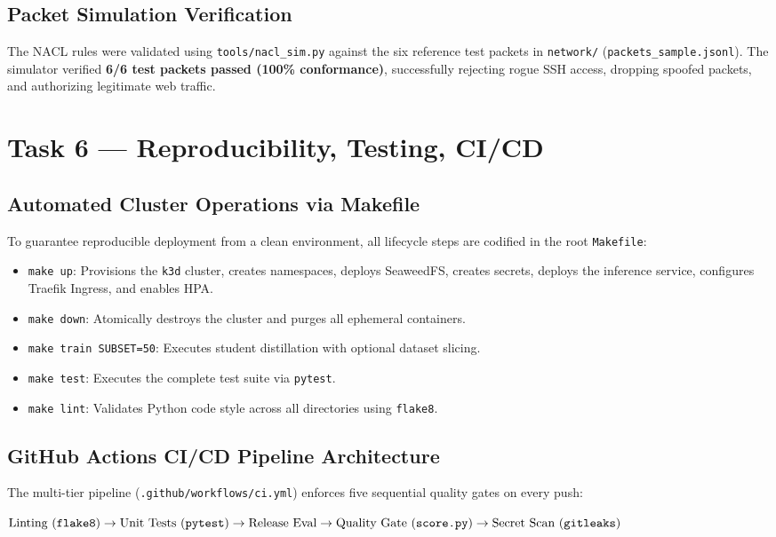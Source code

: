 \documentclass[10pt,a4paper]{article}
\begin{document}
\subsection{Packet Simulation Verification}
The NACL rules were validated using \texttt{tools/nacl\_sim.py} against the six reference test packets in \texttt{network/} (\texttt{packets\_sample.jsonl}). The simulator verified \textbf{6/6 test packets passed (100\% conformance)}, successfully rejecting rogue SSH access, dropping spoofed packets, and authorizing legitimate web traffic.

\vspace{0.25cm}

\section{Task 6 --- Reproducibility, Testing, CI/CD}

\subsection{Automated Cluster Operations via Makefile}
To guarantee reproducible deployment from a clean environment, all lifecycle steps are codified in the root \texttt{Makefile}:
\begin{itemize}[noitemsep,topsep=2pt,leftmargin=*]
    \item \texttt{make up}: Provisions the \texttt{k3d} cluster, creates namespaces, deploys SeaweedFS, creates secrets, deploys the inference service, configures Traefik Ingress, and enables HPA.
    \item \texttt{make down}: Atomically destroys the cluster and purges all ephemeral containers.
    \item \texttt{make train SUBSET=50}: Executes student distillation with optional dataset slicing.
    \item \texttt{make test}: Executes the complete test suite via \texttt{pytest}.
    \item \texttt{make lint}: Validates Python code style across all directories using \texttt{flake8}.
\end{itemize}

\subsection{GitHub Actions CI/CD Pipeline Architecture}
The multi-tier pipeline (\texttt{.github/workflows/ci.yml}) enforces five sequential quality gates on every push:
\begin{center}
\small
$\text{Linting (\texttt{flake8})} \to \text{Unit Tests (\texttt{pytest})} \to \text{Release Eval} \to \text{Quality Gate (\texttt{score.py})} \to \text{Secret Scan (\texttt{gitleaks})}$
\end{center}
\end{document}
